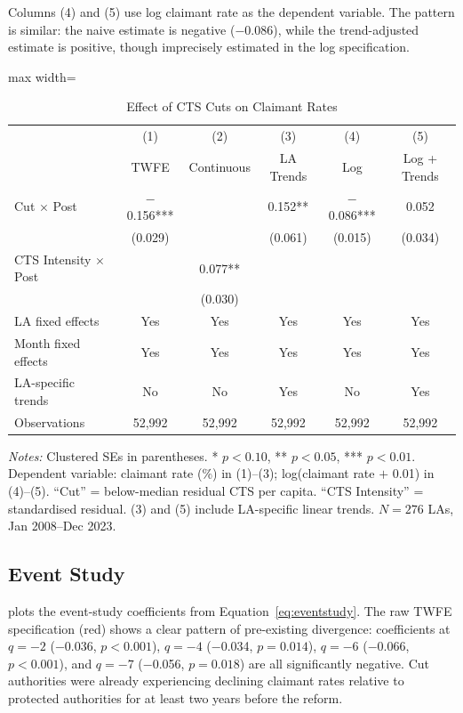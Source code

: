\documentclass[12pt]{article}
\begin{document}
Columns (4) and (5) use log claimant rate as the dependent variable. The pattern is similar: the naive estimate is negative ($-$0.086), while the trend-adjusted estimate is positive, though imprecisely estimated in the log specification.

\begin{table}[H]
\centering
\caption{Effect of CTS Cuts on Claimant Rates}
\label{tab:main}
\begin{adjustbox}{max width=\textwidth}
\begin{threeparttable}
\begin{tabular}{lccccc}
\toprule
& (1) & (2) & (3) & (4) & (5) \\
& TWFE & Continuous & LA Trends & Log & Log + Trends \\
\midrule
Cut $\times$ Post & $-$0.156*** & & 0.152** & $-$0.086*** & 0.052 \\
& (0.029) & & (0.061) & (0.015) & (0.034) \\
CTS Intensity $\times$ Post & & 0.077** & & & \\
& & (0.030) & & & \\
\addlinespace
LA fixed effects & Yes & Yes & Yes & Yes & Yes \\
Month fixed effects & Yes & Yes & Yes & Yes & Yes \\
LA-specific trends & No & No & Yes & No & Yes \\
\addlinespace
Observations & 52,992 & 52,992 & 52,992 & 52,992 & 52,992 \\
\bottomrule
\end{tabular}
\begin{tablenotes}[flushleft]
\footnotesize
\item \emph{Notes:} Clustered SEs in parentheses. * $p<0.10$, ** $p<0.05$, *** $p<0.01$. Dependent variable: claimant rate (\%) in (1)--(3); log(claimant rate $+$ 0.01) in (4)--(5). ``Cut'' = below-median residual CTS per capita. ``CTS Intensity'' = standardised residual. (3) and (5) include LA-specific linear trends. $N = 276$ LAs, Jan 2008--Dec 2023.
\end{tablenotes}
\end{threeparttable}
\end{adjustbox}
\end{table}


\subsection{Event Study}

 plots the event-study coefficients from Equation~\ref{eq:eventstudy}. The raw TWFE specification (red) shows a clear pattern of pre-existing divergence: coefficients at $q = -2$ ($-$0.036, $p < 0.001$), $q = -4$ ($-$0.034, $p = 0.014$), $q = -6$ ($-$0.066, $p < 0.001$), and $q = -7$ ($-$0.056, $p = 0.018$) are all significantly negative. Cut authorities were already experiencing declining claimant rates relative to protected authorities for at least two years before the reform.
\end{document}
